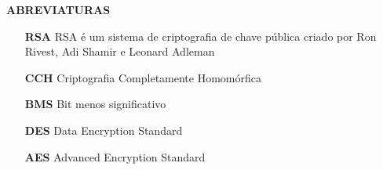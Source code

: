 \begin{center}
	\textbf{ABREVIATURAS}
\end{center}
\begin{itemize}
	\item [\textbf{RSA}] RSA é um sistema de criptografia de chave pública criado por Ron Rivest, Adi Shamir e Leonard Adleman
	\item [\textbf{CCH}] Criptografia Completamente Homomórfica
	\item [\textbf{BMS}] Bit menos significativo
	\item [\textbf{DES}] Data Encryption Standard
	\item [\textbf{AES}] Advanced Encryption Standard
\end{itemize}

